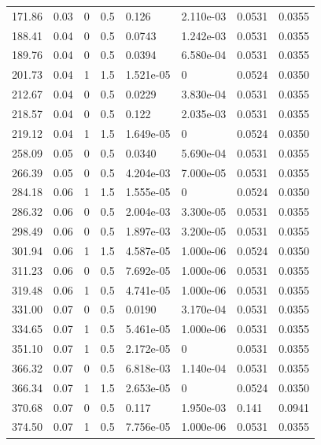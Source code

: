 \documentclass[preview]{standalone}
\begin{document}
{{\begin{tabular}{L{1.2cm}C{1.2cm} C{0.3cm}C{0.5cm} C{1.4cm}C{1.4cm} C{1.4cm}C{1.4cm}}
  171.86  &  0.03  & 0     & 0.5 &  0.126  & 2.110e-03  & 0.0531 &  0.0355   \\ 
  188.41  &  0.04  & 0     & 0.5 &  0.0743  & 1.242e-03  & 0.0531 &  0.0355   \\ 
  189.76  &  0.04  & 0     & 0.5 &  0.0394  & 6.580e-04  & 0.0531 &  0.0355   \\ 
  201.73  &  0.04  & 1     & 1.5 &  1.521e-05  & 0  & 0.0524 &  0.0350   \\ 
  212.67  &  0.04  & 0     & 0.5 &  0.0229  & 3.830e-04  & 0.0531 &  0.0355   \\ 
  218.57  &  0.04  & 0     & 0.5 &  0.122  & 2.035e-03  & 0.0531 &  0.0355   \\ 
  219.12  &  0.04  & 1     & 1.5 &  1.649e-05  & 0  & 0.0524 &  0.0350   \\ 
  258.09  &  0.05  & 0     & 0.5 &  0.0340  & 5.690e-04  & 0.0531 &  0.0355   \\ 
  266.39  &  0.05  & 0     & 0.5 &  4.204e-03  & 7.000e-05  & 0.0531 &  0.0355   \\ 
  284.18  &  0.06  & 1     & 1.5 &  1.555e-05  & 0  & 0.0524 &  0.0350   \\ 
  286.32  &  0.06  & 0     & 0.5 &  2.004e-03  & 3.300e-05  & 0.0531 &  0.0355   \\ 
  298.49  &  0.06  & 0     & 0.5 &  1.897e-03  & 3.200e-05  & 0.0531 &  0.0355   \\ 
  301.94  &  0.06  & 1     & 1.5 &  4.587e-05  & 1.000e-06  & 0.0524 &  0.0350   \\ 
  311.23  &  0.06  & 0     & 0.5 &  7.692e-05  & 1.000e-06  & 0.0531 &  0.0355   \\ 
  319.48  &  0.06  & 1     & 0.5 &  4.741e-05  & 1.000e-06  & 0.0531 &  0.0355   \\ 
  331.00  &  0.07  & 0     & 0.5 &  0.0190  & 3.170e-04  & 0.0531 &  0.0355   \\ 
  334.65  &  0.07  & 1     & 0.5 &  5.461e-05  & 1.000e-06  & 0.0531 &  0.0355   \\ 
  351.10  &  0.07  & 1     & 0.5 &  2.172e-05  & 0  & 0.0531 &  0.0355   \\ 
  366.32  &  0.07  & 0     & 0.5 &  6.818e-03  & 1.140e-04  & 0.0531 &  0.0355   \\ 
  366.34  &  0.07  & 1     & 1.5 &  2.653e-05  & 0  & 0.0524 &  0.0350   \\ 
  370.68  &  0.07  & 0     & 0.5 &  0.117  & 1.950e-03  & 0.141 &  0.0941   \\ 
  374.50  &  0.07  & 1     & 0.5 &  7.756e-05  & 1.000e-06  & 0.0531 &  0.0355   \\ 

\end{tabular}}}
\end{document}

